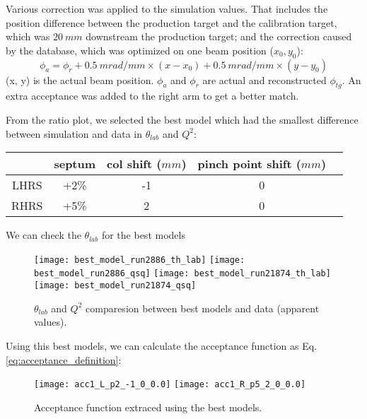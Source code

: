 Various correction was applied to the simulation values. That includes the position
difference between the production target and the calibration target, which was
$20\ mm$ downstream the production \Ca target; and the correction caused by
the database, which was optimized on one beam position ($x_0, y_0$):
\begin{equation}
    \phi_a = \phi_r + 0.5\ mrad/mm \times (x - x_0) + 0.5\ mrad/mm \times (y - y_0)
\end{equation}
(x, y) is the actual beam position. $\phi_a$ and $\phi_r$ are actual and reconstructed
$\phi_{tg}$. An extra acceptance was added to the right arm to get a better 
match.

From the ratio plot, we selected the best model which had the smallest difference
between simulation and data in $\theta_{lab}$ and $Q^2$:
\begin{table}[h!]
    \centering
    \begin{tabular}{c | c c c c}
	\hline
	    & septum & col shift ($mm$)	& pinch point shift ($mm$)	\\
	\hline
	LHRS	& +2\%	& -1	& 0 \\
	RHRS	& +5\%	& 2	& 0 \\
	\hline
    \end{tabular}
\end{table}

We can check the $\theta_{lab}$ for the best models
\begin{figure}[H]
    \centering
    \texttt{[image: best\_model\_run2886\_th\_lab]}
    \texttt{[image: best\_model\_run2886\_qsq]}
    \texttt{[image: best\_model\_run21874\_th\_lab]}
    \texttt{[image: best\_model\_run21874\_qsq]}
    \caption{$\theta_{lab}$ and $Q^2$ comparesion between best models and data (apparent values).}
\end{figure}

Using this best models, we can calculate the acceptance function as Eq. \ref{eq:acceptance_definition}:
\begin{figure}[H]
    \centering
    \texttt{[image: acc1\_L\_p2\_-1\_0\_0.0]}
    \texttt{[image: acc1\_R\_p5\_2\_0\_0.0]}
    \caption{Acceptance function extraced using the best models.}
\end{figure}

